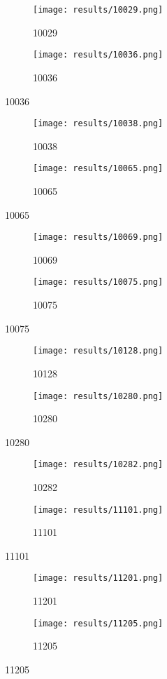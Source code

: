 \documentclass{article}
\begin{document}
\begin{figure}[!hbt]
\begin{subfigure}[!hbt]{0.5\linewidth}\texttt{[image: results/10029.png]}\caption{10029}\end{subfigure}
\begin{subfigure}[!hbt]{0.5\linewidth}\texttt{[image: results/10036.png]}\caption{10036}\end{subfigure}
\end{figure}
\begin{figure}[!hbt]
\begin{subfigure}[!hbt]{0.5\linewidth}\texttt{[image: results/10038.png]}\caption{10038}\end{subfigure}
\begin{subfigure}[!hbt]{0.5\linewidth}\texttt{[image: results/10065.png]}\caption{10065}\end{subfigure}
\end{figure}
\begin{figure}[!hbt]
\begin{subfigure}[!hbt]{0.5\linewidth}\texttt{[image: results/10069.png]}\caption{10069}\end{subfigure}
\begin{subfigure}[!hbt]{0.5\linewidth}\texttt{[image: results/10075.png]}\caption{10075}\end{subfigure}
\end{figure}
\begin{figure}[!hbt]
\begin{subfigure}[!hbt]{0.5\linewidth}\texttt{[image: results/10128.png]}\caption{10128}\end{subfigure}
\begin{subfigure}[!hbt]{0.5\linewidth}\texttt{[image: results/10280.png]}\caption{10280}\end{subfigure}
\end{figure}
\begin{figure}[!hbt]
\begin{subfigure}[!hbt]{0.5\linewidth}\texttt{[image: results/10282.png]}\caption{10282}\end{subfigure}
\begin{subfigure}[!hbt]{0.5\linewidth}\texttt{[image: results/11101.png]}\caption{11101}\end{subfigure}
\end{figure}
\begin{figure}[!hbt]
\begin{subfigure}[!hbt]{0.5\linewidth}\texttt{[image: results/11201.png]}\caption{11201}\end{subfigure}
\begin{subfigure}[!hbt]{0.5\linewidth}\texttt{[image: results/11205.png]}\caption{11205}\end{subfigure}
\end{figure}
\end{document}
